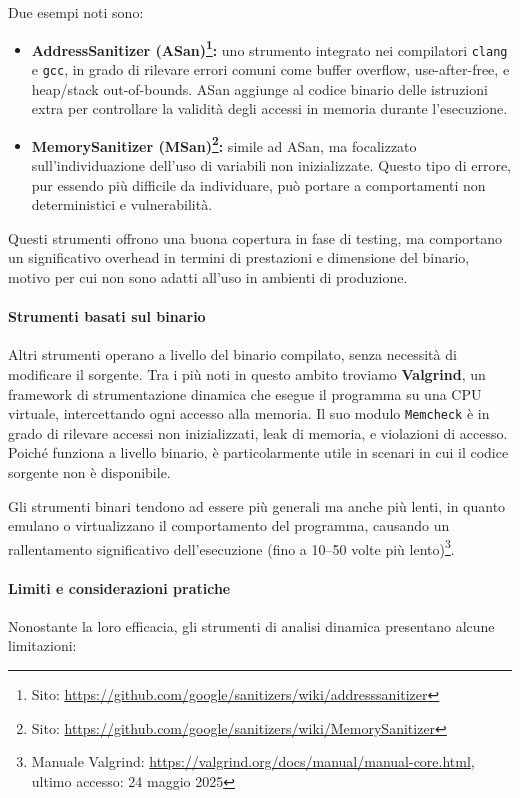 \noindent
Due esempi noti sono:

\begin{itemize}
  \item \textbf{AddressSanitizer (ASan)\footnote{Sito: \url{https://github.com/google/sanitizers/wiki/addresssanitizer}}:}
    uno strumento integrato nei compilatori \texttt{clang} e \texttt{gcc}, in grado
    di rilevare errori comuni come buffer overflow, use-after-free, e heap/stack
    out-of-bounds. ASan aggiunge al codice binario delle istruzioni extra per
    controllare la validità degli accessi in memoria durante l'esecuzione.

  \item \textbf{MemorySanitizer (MSan)\footnote{Sito: \url{https://github.com/google/sanitizers/wiki/MemorySanitizer}}:}
    simile ad ASan, ma focalizzato sull'individuazione dell'uso di variabili non
    inizializzate. Questo tipo di errore, pur essendo più difficile da individuare,
    può portare a comportamenti non deterministici e vulnerabilità.
\end{itemize}

Questi strumenti offrono una buona copertura in fase di testing, ma comportano
un significativo overhead in termini di prestazioni e dimensione del binario, motivo
per cui non sono adatti all'uso in ambienti di produzione.

\paragraph{Strumenti basati sul binario}
Altri strumenti operano a livello del binario compilato, senza necessità di modificare
il sorgente. Tra i più noti in questo ambito troviamo \textbf{Valgrind}, un
framework di strumentazione dinamica che esegue il programma su una CPU virtuale,
intercettando ogni accesso alla memoria. Il suo modulo \texttt{Memcheck} è in grado
di rilevare accessi non inizializzati, leak di memoria, e violazioni di accesso.
Poiché funziona a livello binario, è particolarmente utile in scenari in cui il codice
sorgente non è disponibile.

Gli strumenti binari tendono ad essere più generali ma anche più lenti, in
quanto emulano o virtualizzano il comportamento del programma, causando un rallentamento
significativo dell'esecuzione (fino a 10--50 volte più lento)\footnote{Manuale
Valgrind: \url{https://valgrind.org/docs/manual/manual-core.html}, ultimo
accesso: 24 maggio 2025}.

\paragraph{Limiti e considerazioni pratiche}
Nonostante la loro efficacia, gli strumenti di analisi dinamica presentano alcune
limitazioni:

